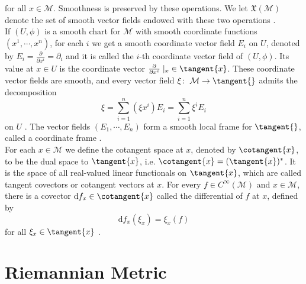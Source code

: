 for all $x \in \mathcal{M}$. Smoothness is preserved by these operations. We let $\mathfrak{X}(\mathcal{M})$ denote the set of smooth vector fields endowed with these two operations \cite[p.~34]{AbsilMahonySepulchre:2008}. \\
If $(U, \phi)$ is a smooth chart for $\mathcal{M}$ with smooth coordinate functions $(x^1, \cdots, x^n)$, for each $i$ we get a smooth coordinate vector field $E_i$ on $U$, denoted by $E_i = \frac{\partial}{\partial x^i}= \partial_i$ and it is called the $i$-th coordinate vector field of $(U, \phi)$. Its value at $x \in U$ is the coordinate vector $\frac{\partial}{\partial x^i} \;\vert_x \in \tangent{x}$. These coordinate vector fields are smooth, and every vector field $\xi \colon \; \mathcal{M} \to \tangent{}$ admits the decomposition
\begin{equation*}
    \xi = \sum^{n}_{i=1} (\xi x^i) E_i = \sum^{n}_{i=1} \xi^i E_i
\end{equation*}
on $U$ \cite[p.~36-37]{AbsilMahonySepulchre:2008}. The vector fields $(E_1, \cdots, E_n)$ form a smooth local frame for $\tangent{}$, called a coordinate frame \cite[p.~384-385]{Lee:2019}. \\
For each $x \in \mathcal{M}$ we define the cotangent space at $x$, denoted by $\cotangent{x}$, to be the dual space to $\tangent{x}$, i.e. $\cotangent{x} = (\tangent{x})^{*}$. It is the space of all real-valued linear functionals on $\tangent{x}$, which are called tangent covectors or cotangent vectors at $x$. For every $f \in C^{\infty}(\mathcal{M})$ and $x \in \mathcal{M}$, there is a covector $\mathrm{d} f_x \in \cotangent{x}$ called the differential of $f$ at $x$, defined by 
\begin{equation*}
    \mathrm{d} f_x (\xi_x) = \xi_x(f)
\end{equation*}
for all $\xi_x \in \tangent{x}$ \cite[p.~377]{Lee:2019}. \\

\section{Riemannian Metric}
\label{Section3.3}

